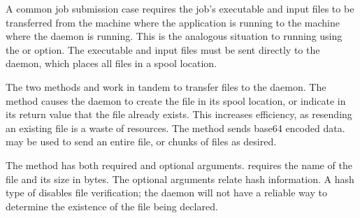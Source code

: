 A common job submission case requires the job's
executable and input files to be transferred
from the machine where the application is running
to the machine where the  daemon is running.
This is the analogous situation to running 
using the  or  option.
The executable and input files must be sent directly to
the  daemon, which places all files
in a spool location.

The two methods 
and  work in tandem to transfer files
to the  daemon.
The  method causes the  daemon
to create the file in its spool location,
or indicate in its return value that the file already exists.
This increases efficiency, 
as resending an existing file is a waste of resources.
The  method sends 
base64 encoded data.
 may be used to send an 
entire file, or chunks of files as desired.
% 

The  method has both required and
optional arguments.
 requires the name of the file
and its size in bytes.
The optional arguments relate hash information.
A hash type of  disables file verification;
the  daemon will not have a reliable way
to determine the existence of the file being declared.

